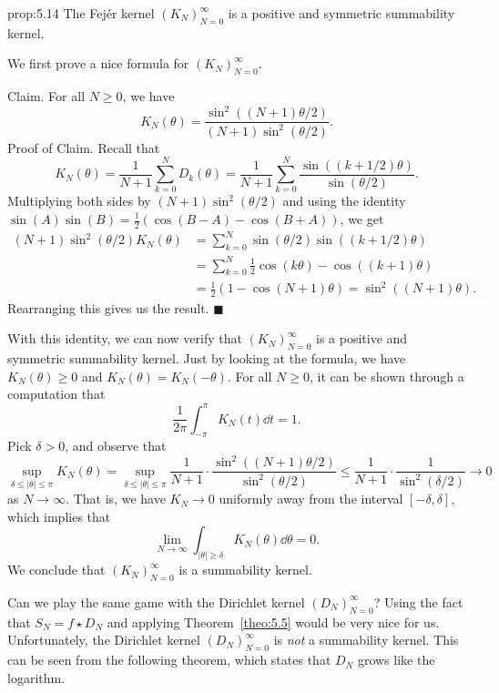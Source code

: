 \begin{prop}{prop:5.14} 
    The Fej\'er kernel $(K_N)_{N=0}^\infty$ is a positive and symmetric summability kernel. 
\end{prop}
\begin{pf}
    We first prove a nice formula for $(K_N)_{N=0}^\infty$. 

    {\sc Claim.} For all $N \geq 0$, we have 
    \[ K_N(\theta) = \frac{\sin^2((N+1)\theta/2)}{(N+1)\sin^2(\theta/2)}. \] 
    {\sc Proof of Claim.} Recall that 
    \[ K_N(\theta) = \frac{1}{N+1} \sum_{k=0}^N D_k(\theta) 
    = \frac{1}{N+1} \sum_{k=0}^N \frac{\sin((k+1/2)\theta)}{\sin(\theta/2)}. \] 
    Multiplying both sides by $(N+1) \sin^2(\theta/2)$ and using the  
    identity $\sin(A) \sin(B) = \frac12(\cos(B-A) - \cos(B+A))$, we get 
    \begin{align*}
        (N+1) \sin^2(\theta/2) K_N(\theta) 
        &= \sum_{k=0}^N \sin(\theta/2) \sin((k+1/2)\theta) \\ 
        &= \sum_{k=0}^N \frac12 \cos(k\theta) - \cos((k+1)\theta) \\ 
        &= \frac12(1 - \cos(N+1)\theta) = \sin^2((N+1)\theta). 
    \end{align*}
    Rearranging this gives us the result. \hfill $\blacksquare$
    
    With this identity, we can now verify that $(K_N)_{N=0}^\infty$ is a 
    positive and symmetric summability kernel. Just by looking at the 
    formula, we have $K_N(\theta) \geq 0$ and $K_N(\theta) = K_N(-\theta)$. 
    For all $N \geq 0$, it can be shown through a computation that 
    \[ \frac{1}{2\pi} \int_{-\pi}^\pi K_N(t)\dd t = 1. \] 
    Pick $\delta > 0$, and observe that 
    \[ \sup_{\delta \leq |\theta| \leq \pi} K_N(\theta) 
    = \sup_{\delta \leq |\theta| \leq \pi} \frac{1}{N+1} \cdot 
    \frac{\sin^2((N+1)\theta/2)}{\sin^2(\theta/2)} \leq 
    \frac{1}{N+1} \cdot \frac{1}{\sin^2(\delta/2)} \to 0 \] 
    as $N \to \infty$. That is, we have $K_N \to 0$ uniformly away from 
    the interval $[-\delta, \delta]$, which implies that 
    \[ \lim_{N\to\infty} \int_{|\theta|\geq\delta} K_N(\theta)\dd\theta = 0. \] 
    We conclude that $(K_N)_{N=0}^\infty$ is a summability kernel. 
\end{pf}

Can we play the same game with the Dirichlet kernel $(D_N)_{N=0}^\infty$? 
Using the fact that $S_N = f \star D_N$ and applying Theorem~\ref{theo:5.5} would 
be very nice for us. Unfortunately, the Dirichlet kernel $(D_N)_{N=0}^\infty$ is 
\emph{not} a summability kernel. This can be seen from the following theorem, 
which states that $D_N$ grows like the logarithm. 

